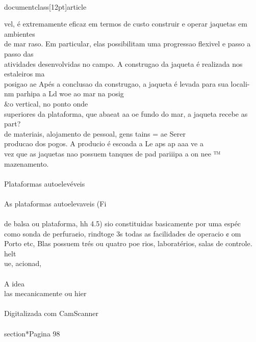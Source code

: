 \\documentclass[12pt]{article}
\begin{document}
vel, é extremamente eficaz em termos de custo construir e operar jaquetas em ambientes\\
de mar raso. Em particular, elas possibilitam uma progressao flexivel e passo a passo das\\
atividades desenvolvidas no campo. A construgao da jaqueta é realizada nos estaleiros ma\\
posigao ae Apés a conclusao da construgao, a jaqueta é levada para sua locali-\\
nm parhipa a Ld woe ao mar na posig\\&o vertical, no ponto onde\\
superiores da plataforma, que abaeat aa oe fundo do mar, a jaqueta recebe as part?\\
de materiais, alojamento de pessoal, gens tains = ae Serer\\
producao dos pogos. A producio é escoada a Le aps ap aaa ve a\\
vez que as jaquetas nao possuem tanques de pad pariiipa a on nee ™\\
mazenamento.\\
\\
Plataformas autoelevéveis\\
\\
As plataformas autoelevaveis (Fi\\
\\
de balsa ou plataforma, hh 4.5) sio constituidas basicamente por uma espéc\\
como sonda de perfura¢io, rindtoge 3s todas as facilidades de operacio ¢ om\\
Porto etc, Blas possuem trés ou quatro poe rios, laboratérios, salas de controle. helt\\
ue, acionad,\\
\\
A idea\\
las mecanicamente ou hier\\
\\
Digitalizada com CamScanner\\

\\section*{Pagina 98}
\end{document}
